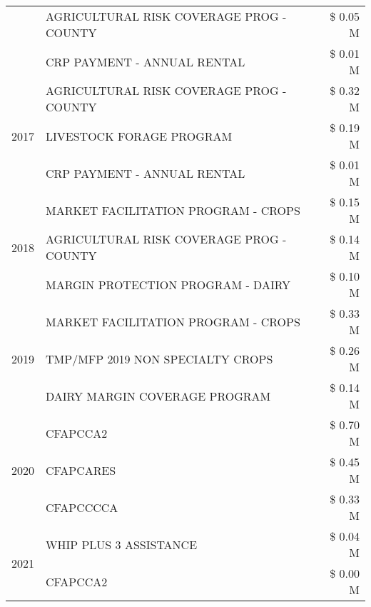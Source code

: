 \begin{tabular}{llr}
 & AGRICULTURAL RISK COVERAGE PROG - COUNTY & \$ 0.05 M \\
 & CRP PAYMENT - ANNUAL RENTAL & \$ 0.01 M \\
\cline{1-3}
\multirow[t]{3}{*}{2017} & AGRICULTURAL RISK COVERAGE PROG - COUNTY & \$ 0.32 M \\
 & LIVESTOCK FORAGE PROGRAM & \$ 0.19 M \\
 & CRP PAYMENT - ANNUAL RENTAL & \$ 0.01 M \\
\cline{1-3}
\multirow[t]{3}{*}{2018} & MARKET FACILITATION PROGRAM - CROPS & \$ 0.15 M \\
 & AGRICULTURAL RISK COVERAGE PROG - COUNTY & \$ 0.14 M \\
 & MARGIN PROTECTION PROGRAM - DAIRY & \$ 0.10 M \\
\cline{1-3}
\multirow[t]{3}{*}{2019} & MARKET FACILITATION PROGRAM - CROPS & \$ 0.33 M \\
 & TMP/MFP 2019 NON SPECIALTY CROPS & \$ 0.26 M \\
 & DAIRY MARGIN COVERAGE PROGRAM & \$ 0.14 M \\
\cline{1-3}
\multirow[t]{3}{*}{2020} & CFAPCCA2 & \$ 0.70 M \\
 & CFAPCARES & \$ 0.45 M \\
 & CFAPCCCCA & \$ 0.33 M \\
\cline{1-3}
\multirow[t]{2}{*}{2021} & WHIP PLUS 3 ASSISTANCE & \$ 0.04 M \\
 & CFAPCCA2 & \$ 0.00 M \\
\cline{1-3}
\bottomrule
\end{tabular}
